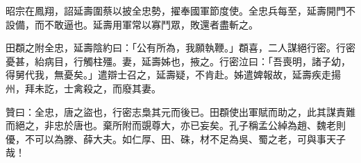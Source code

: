 \begin{pinyinscope}
 昭宗在鳳翔，詔延壽圍蔡以披全忠勢，擢奉國軍節度使。全忠兵每至，延壽開門不設備，而不敢逼也。延壽用軍常以寡鬥眾，敗還者盡斬之。



 田頵之附全忠，延壽陰約曰：「公有所為，我願執鞭。」頵喜，二人謀絕行密。行密憂甚，紿病目，行觸柱殭。妻，延壽姊也，掖之。行密泣曰：「吾喪明，諸子幼，得舅代我，無憂矣。」遣辯士召之，延壽疑，不肯赴。姊遣婢報故，延壽疾走揚州，拜未訖，士禽殺之，而廢其妻。



 贊曰：全忠，唐之盜也，行密志梟其元而後已。田頵使出軍賦而助之，此其謀責難而絕之，非忠於唐也。棄所附而覬尊大，亦已妄矣。孔子稱孟公綽為趙、魏老則優，不可以為滕、薛大夫。如仁厚、田、硃，材不足為吳、蜀之老，可與事天子哉！



\end{pinyinscope}